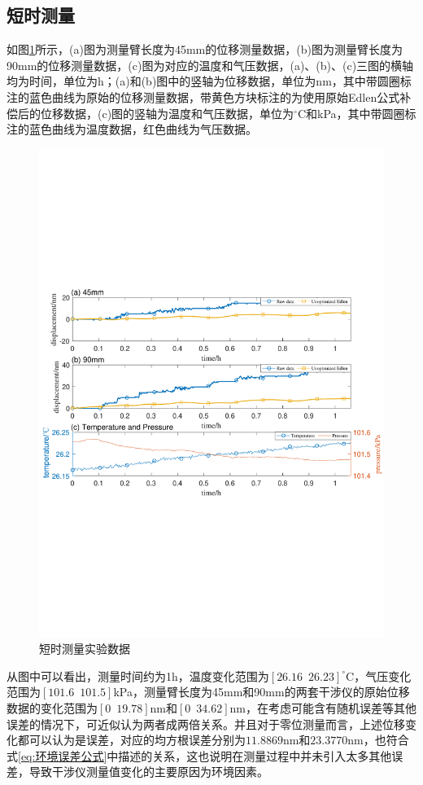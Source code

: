 \subsection{短时测量}
如图\ref{fig:短时测量实验数据}所示，(a)图为测量臂长度为45mm的位移测量数据，(b)图为测量臂长度为90mm的位移测量数据，(c)图为对应的温度和气压数据，(a)、(b)、(c)三图的横轴均为时间，单位为h；(a)和(b)图中的竖轴为位移数据，单位为nm，其中带圆圈标注的蓝色曲线为原始的位移测量数据，带黄色方块标注的为使用原始Edlen公式补偿后的位移数据，(c)图的竖轴为温度和气压数据，单位为$^{\circ} \mathrm{C}$和kPa，其中带圆圈标注的蓝色曲线为温度数据，红色曲线为气压数据。
\begin{figure}[htb]
    \centering
    \includegraphics[width=14cm]{fig/3-fig/短时测量数据.pdf}
    \caption{短时测量实验数据}
    \label{fig:短时测量实验数据}
\end{figure}
从图中可以看出，测量时间约为1h，温度变化范围为$[26.16\,\,\,26.23]^{\circ} \mathrm{C}$，气压变化范围为$[101.6\,\,\,101.5]$kPa，测量臂长度为45mm和90mm的两套干涉仪的原始位移数据的变化范围为$[0\,\,\,19.78]$nm和$[0\,\,\,34.62]$nm，在考虑可能含有随机误差等其他误差的情况下，可近似认为两者成两倍关系。并且对于零位测量而言，上述位移变化都可以认为是误差，对应的均方根误差分别为$11.8869$nm和$23.3770$nm，也符合式\eqref{eq:环境误差公式}中描述的关系，这也说明在测量过程中并未引入太多其他误差，导致干涉仪测量值变化的主要原因为环境因素。

